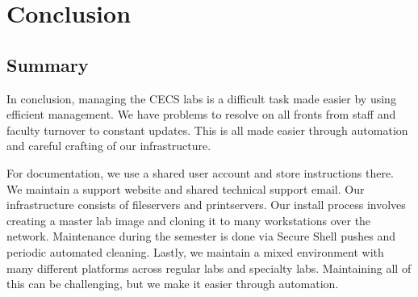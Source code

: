 \chapter{Conclusion} \label{ch:conclusion}
\section{Summary} \label{sec:summary}
In conclusion, managing the CECS labs is a difficult task made easier by using efficient management. We have problems to resolve on all fronts from staff and faculty turnover to constant updates. This is all made easier through automation and careful crafting of our infrastructure. 

For documentation, we use a shared user account and store instructions there.  We maintain a support website and shared technical support email.  Our infrastructure consists of fileservers and printservers.  Our install process involves creating a master lab image and cloning it to many workstations over the network.  Maintenance during the semester is done via Secure Shell pushes and periodic automated cleaning.  Lastly, we maintain a mixed environment with many different platforms across regular labs and specialty labs.  Maintaining all of this can be challenging, but we make it easier through automation. 
